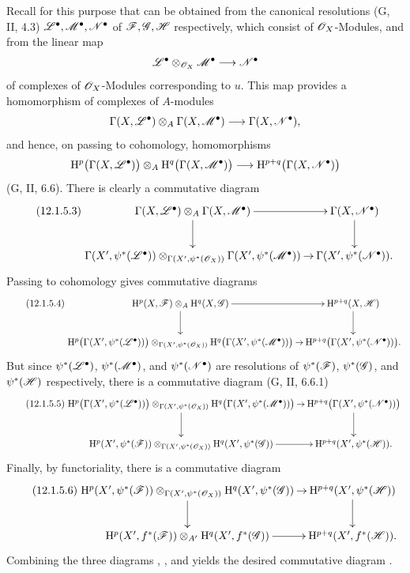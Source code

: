 \begin{env}[12.1.5]
Recall for this purpose that  can be obtained from
the canonical resolutions (G, II, 4.3)
$\mathscr{L}^\bullet,\mathscr{M}^\bullet,\mathscr{N}^\bullet$ of
$\mathscr{F},\mathscr{G},\mathscr{H}$ respectively, which consist of
$\mathscr{O}_X$-Modules, and from the linear map
\[
  \mathscr{L}^\bullet\otimes_{\mathscr{O}_X}\mathscr{M}^\bullet
  \longrightarrow
  \mathscr{N}^\bullet
\]
of complexes of $\mathscr{O}_X$-Modules corresponding to $u$.
This map provides a homomorphism of complexes of $A$-modules
\[
  \Gamma(X,\mathscr{L}^\bullet)\otimes_A\Gamma(X,\mathscr{M}^\bullet)
  \longrightarrow
  \Gamma(X,\mathscr{N}^\bullet),
\]
and hence, on passing to cohomology, homomorphisms
\[
  \mathrm{H}^p\bigl(\Gamma(X,\mathscr{L}^\bullet)\bigr)
  \otimes_A
  \mathrm{H}^q\bigl(\Gamma(X,\mathscr{M}^\bullet)\bigr)
  \longrightarrow
  \mathrm{H}^{p+q}\bigl(\Gamma(X,\mathscr{N}^\bullet)\bigr)
\]
(G, II, 6.6).
There is clearly a commutative diagram
\[
\label{0.12.1.5.3}
\tag{12.1.5.3}
  \xymatrix@C=8pt{
    \Gamma(X,\sh{L}^\bullet)\otimes_A
      \Gamma(X,\sh{M}^\bullet)
      \ar[r]\ar[d]
      & \Gamma(X,\sh{N}^\bullet)\ar[d]\\
    \Gamma(X',\psi^*(\sh{L}^\bullet))
      \otimes_{\Gamma(X',\psi^*(\sh{O}_X))}
      \Gamma(X',\psi^*(\sh{M}^\bullet))
      \ar[r]
      & \Gamma(X',\psi^*(\sh{N}^\bullet)).
  }
\]
Passing to cohomology gives commutative diagrams
\[
\label{0.12.1.5.4}
\tag{12.1.5.4}
  \xymatrix@C=7pt{
    \HH^p(X,\sh{F})\otimes_A\HH^q(X,\sh{G})
      \ar[r]\ar[d]
      & \HH^{p+q}(X,\sh{H})\ar[d]\\
    \HH^p\bigl(\Gamma(X',\psi^*(\sh{L}^\bullet))\bigr)
      \otimes_{\Gamma(X',\psi^*(\sh{O}_X))}
      \HH^q\bigl(\Gamma(X',\psi^*(\sh{M}^\bullet))\bigr)
      \ar[r]
      & \HH^{p+q}\bigl(\Gamma(X',\psi^*(\sh{N}^\bullet))\bigr).
  }
\]
But since
$\psi^*(\mathscr{L}^\bullet)$,
$\psi^*(\mathscr{M}^\bullet)$, and
$\psi^*(\mathscr{N}^\bullet)$
are resolutions of
$\psi^*(\mathscr{F})$,
$\psi^*(\mathscr{G})$, and
$\psi^*(\mathscr{H})$ respectively, there is a commutative diagram
(G, II, 6.6.1)
\[
\label{0.12.1.5.5}
\tag{12.1.5.5}
  \xymatrix@C=7pt{
    \HH^p\bigl(\Gamma(X',\psi^*(\sh{L}^\bullet))\bigr)
      \otimes_{\Gamma(X',\psi^*(\sh{O}_X))}
      \HH^q\bigl(\Gamma(X',\psi^*(\sh{M}^\bullet))\bigr)
      \ar[r]\ar[d]
      & \HH^{p+q}\bigl(\Gamma(X',\psi^*(\sh{N}^\bullet))\bigr)
        \ar[d]\\
    \HH^p(X',\psi^*(\sh{F}))
      \otimes_{\Gamma(X',\psi^*(\sh{O}_X))}
      \HH^q(X',\psi^*(\sh{G}))
      \ar[r]
      & \HH^{p+q}(X',\psi^*(\sh{H})).
  }
\]
Finally, by functoriality, there is a commutative diagram
\[
\label{0.12.1.5.6}
\tag{12.1.5.6}
  \xymatrix@C=7pt{
    \HH^p(X',\psi^*(\sh{F}))
      \otimes_{\Gamma(X',\psi^*(\sh{O}_X))}
      \HH^q(X',\psi^*(\sh{G}))
      \ar[r]\ar[d]
      & \HH^{p+q}(X',\psi^*(\sh{H}))\ar[d]\\
    \HH^p(X',f^*(\sh{F}))\otimes_{A'}
      \HH^q(X',f^*(\sh{G}))
      \ar[r]
      & \HH^{p+q}(X',f^*(\sh{H})).
  }
\]
Combining the three diagrams ,
, and  yields the desired
commutative diagram .
\end{env}

